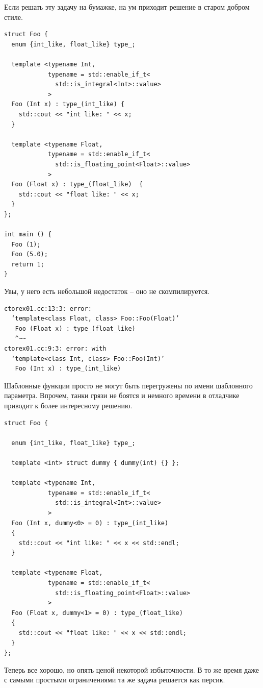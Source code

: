 \documentclass[a4paper,12pt,oneside]{book}
\begin{document}
Если решать эту задачу на бумажке, на ум приходит решение в старом добром стиле.

\begin{lstlisting}
struct Foo {
  enum {int_like, float_like} type_;

  template <typename Int, 
            typename = std::enable_if_t<
              std::is_integral<Int>::value>
            >
  Foo (Int x) : type_(int_like) { 
    std::cout << "int like: " << x; 
  }

  template <typename Float, 
            typename = std::enable_if_t<
              std::is_floating_point<Float>::value>
            >
  Foo (Float x) : type_(float_like)  { 
    std::cout << "float like: " << x; 
  }
};

int main () {
  Foo (1);
  Foo (5.0);
  return 1;
}
\end{lstlisting}

Увы, у него есть небольшой недостаток -- оно не скомпилируется.

\begin{verbatim}
ctorex01.cc:13:3: error: 
  ‘template<class Float, class> Foo::Foo(Float)’ 
   Foo (Float x) : type_(float_like)     
   ^~~
ctorex01.cc:9:3: error: with 
  ‘template<class Int, class> Foo::Foo(Int)’
   Foo (Int x) : type_(int_like)
\end{verbatim}

Шаблонные функции просто не могут быть перегружены по имени шаблонного параметра. Впрочем, танки грязи не боятся и немного времени в отладчике приводит к более интересному решению.

\begin{lstlisting}
struct Foo {

  enum {int_like, float_like} type_;

  template <int> struct dummy { dummy(int) {} };

  template <typename Int,
            typename = std::enable_if_t<
              std::is_integral<Int>::value>
            >
  Foo (Int x, dummy<0> = 0) : type_(int_like)
  {
    std::cout << "int like: " << x << std::endl;
  }

  template <typename Float,
            typename = std::enable_if_t<
              std::is_floating_point<Float>::value>
            >
  Foo (Float x, dummy<1> = 0) : type_(float_like)
  {
    std::cout << "float like: " << x << std::endl;
  }
};
\end{lstlisting}

Теперь все хорошо, но опять ценой некоторой избыточности. В то же время даже с самыми простыми ограничениями та же задача решается как персик.
\end{document}
